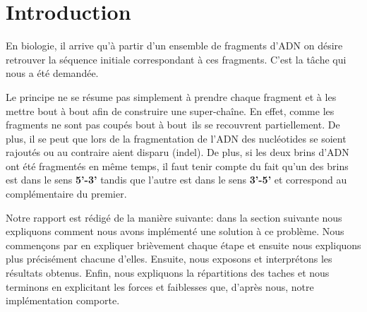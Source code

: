 
\section{Introduction}

En biologie, il arrive qu'à partir d'un ensemble de fragments d'ADN on désire retrouver la séquence initiale correspondant à ces fragments.
C'est la tâche qui nous a été demandée. 

Le principe ne se résume pas simplement à prendre chaque fragment et à les mettre bout à bout afin de construire une super-chaîne. En effet,
comme les fragments ne sont pas coupés \og bout à bout\fg~ils se recouvrent partiellement. De plus, il se peut que lors de la fragmentation de l'ADN des nucléotides se soient rajoutés ou au contraire aient disparu (indel). De plus, si les deux brins d'ADN ont été fragmentés en même temps, il faut tenir compte du fait qu'un des brins est dans le sens \textbf{5'-3'} tandis que l'autre est dans le sens \textbf{3'-5'} et correspond au complémentaire du premier.

Notre rapport est rédigé de la manière suivante: dans la section suivante nous expliquons comment nous avons implémenté une solution à ce problème. Nous commençons par en expliquer brièvement chaque étape et ensuite nous expliquons plus précisément chacune d'elles. Ensuite, nous exposons et interprétons les résultats obtenus. Enfin, nous expliquons la répartitions des taches et nous terminons en  explicitant les forces et faiblesses que, d'après nous, notre implémentation comporte.
